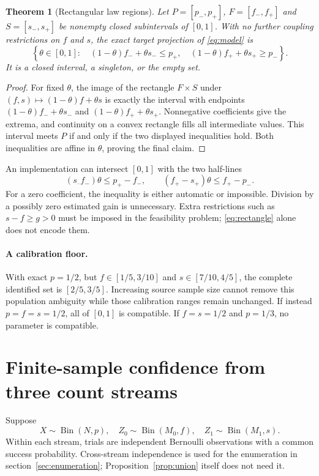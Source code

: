 \documentclass[11pt,a4paper]{article}
\newtheorem{theorem}{Theorem}\newtheorem{proposition}[theorem]{Proposition}\newtheorem{lemma}[theorem]{Lemma}
\theoremstyle{definition}\newtheorem{definition}[theorem]{Definition}
\begin{document}
\begin{theorem}[Rectangular law regions]\label{thm:rectangle}
Let $P=[p_-,p_+]$, $F=[f_-,f_+]$ and $S=[s_-,s_+]$ be nonempty closed subintervals of $[0,1]$. With no further coupling restrictions on $f$ and $s$, the exact target projection of \eqref{eq:model} is
\begin{equation}\label{eq:rectangle}
\left\{\theta\in[0,1]:\quad
(1-\theta)f_-+\theta s_-\le p_+,\quad
(1-\theta)f_++\theta s_+\ge p_-\right\}.
\end{equation}
It is a closed interval, a singleton, or the empty set.
\end{theorem}
\begin{proof}
For fixed $\theta$, the image of the rectangle $F\times S$ under $(f,s)\mapsto(1-\theta)f+\theta s$ is exactly the interval with endpoints $(1-\theta)f_-+\theta s_-$ and $(1-\theta)f_++\theta s_+$. Nonnegative coefficients give the extrema, and continuity on a convex rectangle fills all intermediate values. This interval meets $P$ if and only if the two displayed inequalities hold. Both inequalities are affine in $\theta$, proving the final claim.
\end{proof}

An implementation can intersect $[0,1]$ with the two half-lines
\[
(s_–f_-)\theta\le p_+-f_-,\qquad
(f_+-s_+)\theta\le f_+-p_-.
\]
For a zero coefficient, the inequality is either automatic or impossible. Division by a possibly zero estimated gain is unnecessary. Extra restrictions such as $s-f\ge g>0$ must be imposed in the feasibility problem; \eqref{eq:rectangle} alone does not encode them.

\paragraph{A calibration floor.}
With exact $p=1/2$, but $f\in[1/5,3/10]$ and $s\in[7/10,4/5]$, the complete identified set is $[2/5,3/5]$. Increasing source sample size cannot remove this population ambiguity while those calibration ranges remain unchanged. If instead $p=f=s=1/2$, all of $[0,1]$ is compatible. If $f=s=1/2$ and $p=1/3$, no parameter is compatible.

\section{Finite-sample confidence from three count streams}

Suppose
\[
X\sim\operatorname{Bin}(N,p),\quad
Z_0\sim\operatorname{Bin}(M_0,f),\quad
Z_1\sim\operatorname{Bin}(M_1,s).
\]
Within each stream, trials are independent Bernoulli observations with a common success probability. Cross-stream independence is used for the enumeration in section~\ref{sec:enumeration}; Proposition~\ref{prop:union} itself does not need it.
\end{document}
